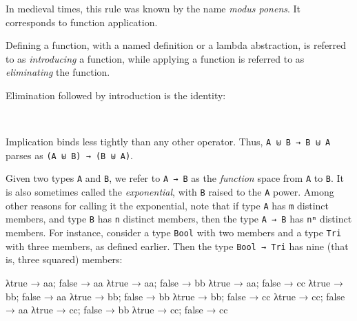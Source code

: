 In medieval times, this rule was known by the name \emph{modus ponens}.
It corresponds to function application.

Defining a function, with a named definition or a lambda abstraction, is
referred to as \emph{introducing} a function, while applying a function
is referred to as \emph{eliminating} the function.

Elimination followed by introduction is the identity:

\begin{fence}
\begin{code}%
\>[0]\AgdaSpace{}%
\AgdaSymbol{:}\AgdaSpace{}%
\AgdaSpace{}%
\AgdaSymbol{\{}\AgdaSpace{}%
\AgdaSpace{}%
\AgdaSymbol{:}\AgdaSpace{}%
\AgdaSymbol{\}}\AgdaSpace{}%
\AgdaSymbol{(}\AgdaSpace{}%
\AgdaSymbol{:}\AgdaSpace{}%
\AgdaSpace{}%
\AgdaSpace{}%
\AgdaSymbol{)}\AgdaSpace{}%
\AgdaSpace{}%
\AgdaSpace{}%
\AgdaSymbol{(}\AgdaSpace{}%
\AgdaSymbol{:}\AgdaSpace{}%
\AgdaSymbol{)}\AgdaSpace{}%
\AgdaSpace{}%
\AgdaSpace{}%
\AgdaSymbol{)}\AgdaSpace{}%
\AgdaSpace{}%
\<%
\\
\>[0]\AgdaSpace{}%
\AgdaSpace{}%
\AgdaSymbol{=}\AgdaSpace{}%
\<%
\end{code}
\end{fence}

Implication binds less tightly than any other operator. Thus,
\texttt{A\ ⊎\ B\ →\ B\ ⊎\ A} parses as \texttt{(A\ ⊎\ B)\ →\ (B\ ⊎\ A)}.

Given two types \texttt{A} and \texttt{B}, we refer to \texttt{A\ →\ B}
as the \emph{function} space from \texttt{A} to \texttt{B}. It is also
sometimes called the \emph{exponential}, with \texttt{B} raised to the
\texttt{A} power. Among other reasons for calling it the exponential,
note that if type \texttt{A} has \texttt{m} distinct members, and type
\texttt{B} has \texttt{n} distinct members, then the type
\texttt{A\ →\ B} has \texttt{nᵐ} distinct members. For instance,
consider a type \texttt{Bool} with two members and a type \texttt{Tri}
with three members, as defined earlier. Then the type
\texttt{Bool\ →\ Tri} has nine (that is, three squared) members:

\begin{myDisplay}
λ{true → aa; false → aa}  λ{true → aa; false → bb}  λ{true → aa; false → cc}
λ{true → bb; false → aa}  λ{true → bb; false → bb}  λ{true → bb; false → cc}
λ{true → cc; false → aa}  λ{true → cc; false → bb}  λ{true → cc; false → cc}
\end{myDisplay}

